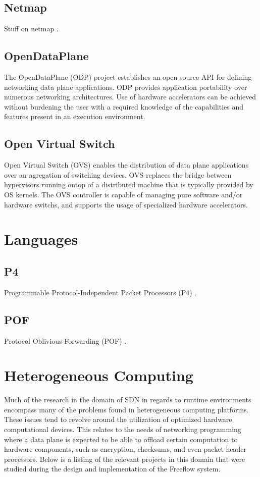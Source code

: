 \subsection{Netmap}
\label{related:netmap}
Stuff on netmap \cite{netmap}.

\subsection{OpenDataPlane}
\label{related:odp}
The OpenDataPlane (ODP) project \cite{odp} establishes an open source API for
defining networking data plane applications. ODP provides application
portability over numerous networking architectures. Use of hardware
accelerators can be achieved without burdening the user with a required
knowledge of the capabilities and features present in an execution environment.

\subsection{Open Virtual Switch}
\label{related:ovs}
Open Virtual Switch (OVS) \cite{ovs} enables the distribution of data
plane applications over an agregation of switching devices. OVS replaces
the bridge between hypervisors running ontop of a distributed machine that
is typically provided by OS kernels. The OVS controller is capable of managing
pure software and/or hardware switchs, and supports the usage of specialized
hardware accelerators.

\section{Languages}
\label{related:lang}

\subsection{P4}
\label{related:p4}
Programmable Protocol-Independent Packet Processors (P4) \cite{p4}.

\subsection{POF}
\label{related:pof}
Protocol Oblivious Forwarding (POF) \cite{pof}.

\section{Heterogeneous Computing}
\label{related:hcp}
Much of the research in the domain of SDN in regards to runtime environments
encompass many of the problems found in heterogeneous computing platforms.
These issues tend to revolve around the utilization of optimized hardware
computational devices. This relates to the needs of networking programming
where a data plane is expected to be able to offload certain computation to
hardware components, such as encryption, checksums, and even packet header
processors. Below is a listing of the relevant projects in this domain that
were studied during the design and implementation of the Freeflow system.

